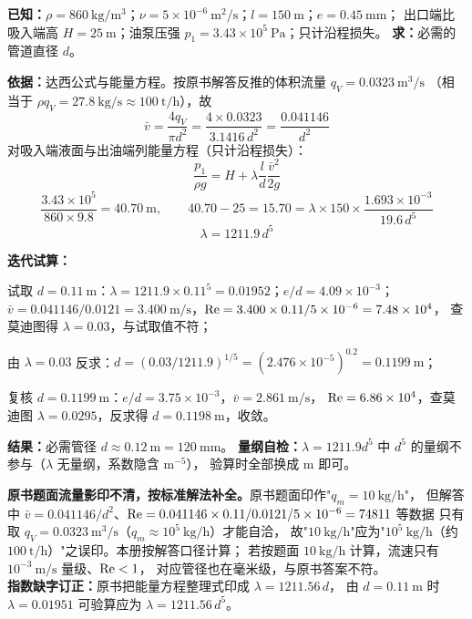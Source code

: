 \begin{jie}
\textbf{已知：}$\rho=860\ \mathrm{kg/m^3}$；$\nu=5\times10^{-6}\ \mathrm{m^2/s}$；$l=150\ \mathrm{m}$；$e=0.45\ \mathrm{mm}$；
出口端比吸入端高 $H=25\ \mathrm{m}$；油泵压强 $p_1=3.43\times10^5\ \mathrm{Pa}$；只计沿程损失。
\textbf{求：}必需的管道直径 $d$。

\textbf{依据：}达西公式与能量方程。按原书解答反推的体积流量 $q_V=0.0323\ \mathrm{m^3/s}$
（相当于 $\rho q_V=27.8\ \mathrm{kg/s}\approx100\ \mathrm{t/h}$），故
\[ \bar v=\frac{4q_V}{\pi d^2}=\frac{4\times0.0323}{3.1416\,d^2}=\frac{0.041146}{d^2} \]
对吸入端液面与出油端列能量方程（只计沿程损失）：
\[ \frac{p_1}{\rho g}=H+\lambda\frac ld\frac{\bar v^2}{2g} \]
\[ \frac{3.43\times10^5}{860\times9.8}=40.70\ \mathrm{m},\qquad
40.70-25=15.70=\lambda\times150\times\frac{1.693\times10^{-3}}{19.6\,d^5} \]
\[ \lambda=1211.9\,d^5 \]

\textbf{迭代试算：}
\begin{xiaowen}
\item 试取 $d=0.11\ \mathrm{m}$：$\lambda=1211.9\times0.11^5=0.01952$；$e/d=4.09\times10^{-3}$；
$\bar v=0.041146/0.0121=3.400\ \mathrm{m/s}$，$\mathrm{Re}=3.400\times0.11/5\times10^{-6}=7.48\times10^4$，
查莫迪图得 $\lambda=0.03$，与试取值不符；
\item 由 $\lambda=0.03$ 反求：$d=(0.03/1211.9)^{1/5}=(2.476\times10^{-5})^{0.2}=0.1199\ \mathrm{m}$；
\item 复核 $d=0.1199\ \mathrm{m}$：$e/d=3.75\times10^{-3}$，$\bar v=2.861\ \mathrm{m/s}$，
$\mathrm{Re}=6.86\times10^4$，查莫迪图 $\lambda=0.0295$，反求得 $d=0.1198\ \mathrm{m}$，收敛。
\end{xiaowen}

\textbf{结果：}必需管径 $d\approx0.12\ \mathrm{m}=120\ \mathrm{mm}$。
\textbf{量纲自检：}$\lambda=1211.9d^5$ 中 $d^5$ 的量纲不参与（$\lambda$ 无量纲，系数隐含 $\mathrm{m^{-5}}$），
验算时全部换成 $\mathrm{m}$ 即可。
\end{jie}

\begin{tishi}
\textbf{原书题面流量影印不清，按标准解法补全。}原书题面印作"$q_m=10\ \mathrm{kg/h}$"，
但解答中 $\bar v=0.041146/d^2$、$\mathrm{Re}=0.041146\times0.11/0.0121/5\times10^{-6}=74811$ 等数据
只有取 $q_V=0.0323\ \mathrm{m^3/s}$（$q_m\approx10^5\ \mathrm{kg/h}$）才能自洽，
故"$10\ \mathrm{kg/h}$"应为"$10^5\ \mathrm{kg/h}$（约 $100\ \mathrm{t/h}$）"之误印。本册按解答口径计算；
若按题面 $10\ \mathrm{kg/h}$ 计算，流速只有 $10^{-3}\ \mathrm{m/s}$ 量级、$\mathrm{Re}<1$，
对应管径也在毫米级，与原书答案不符。\\
\textbf{指数缺字订正：}原书把能量方程整理式印成 $\lambda=1211.56\,d$，
由 $d=0.11\ \mathrm{m}$ 时 $\lambda=0.01951$ 可验算应为 $\lambda=1211.56\,d^5$。
\end{tishi}

